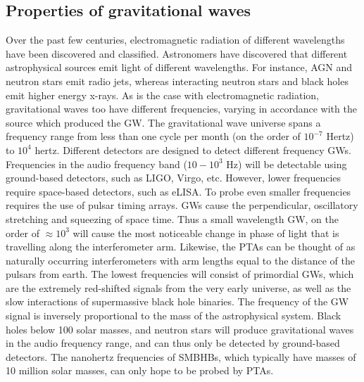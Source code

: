 \documentclass[12pt]{article}
\begin{document}
	\subsection{Properties of gravitational waves}
	Over the past few centuries, electromagnetic radiation of different wavelengths have been discovered and classified. Astronomers have discovered that different astrophysical sources emit light of different wavelengths. For instance, AGN and neutron stars emit radio jets, whereas interacting neutron stars and black holes emit higher energy x-rays. 
	As is the case with electromagnetic radiation, gravitational waves too have different frequencies, varying in accordance with the source which produced the GW. The gravitational wave universe spans a frequency range from less than one cycle per month (on the order of $10^{-7}$ Hertz) to $10^4$ hertz. Different detectors are designed to detect different frequency GWs. Frequencies in the audio frequency band ($10-10^3$ Hz) will be detectable using ground-based detectors, such as LIGO, Virgo, etc.  However, lower frequencies require space-based detectors, such as eLISA. To probe even smaller frequencies requires the use of pulsar timing arrays. GWs cause the perpendicular, oscillatory stretching and squeezing of space time. Thus a small wavelength GW, on the order of $\approx 10^3$ will cause the most noticeable change in phase of light that is travelling along the interferometer arm. Likewise, the PTAs can be thought of as naturally occurring interferometers with arm lengths equal to the distance of the pulsars from earth. The lowest frequencies will consist of primordial GWs, which are the extremely red-shifted signals from the very early universe, as well as the slow interactions of supermassive black hole binaries. The frequency of the GW signal is inversely proportional to the mass of the astrophysical system. Black holes below 100 solar masses, and neutron stars will produce gravitational waves in the audio frequency range, and can thus only be detected by ground-based detectors. The nanohertz frequencies of SMBHBs, which typically have masses of 10 million solar masses, can only hope to be probed by PTAs.\\
\end{document}
